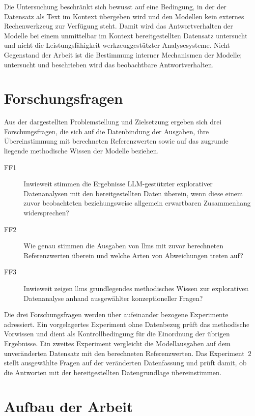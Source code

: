 Die Untersuchung beschränkt sich bewusst auf eine Bedingung, in der der Datensatz als Text im Kontext übergeben wird und den Modellen kein externes Rechenwerkzeug zur Verfügung steht. Damit wird das Antwortverhalten der Modelle bei einem unmittelbar im Kontext bereitgestellten Datensatz untersucht und nicht die Leistungsfähigkeit werkzeuggestützter Analysesysteme. Nicht Gegenstand der Arbeit ist die Bestimmung interner Mechanismen der Modelle; untersucht und beschrieben wird das beobachtbare Antwortverhalten.

\section{Forschungsfragen}

Aus der dargestellten Problemstellung und Zielsetzung ergeben sich drei Forschungsfragen, die sich auf die Datenbindung der Ausgaben, ihre Übereinstimmung mit berechneten Referenzwerten sowie auf das zugrunde liegende methodische Wissen der Modelle beziehen.

\begin{description}
    \item[FF1] Inwieweit stimmen die Ergebnisse LLM-gestützter explorativer Datenanalysen mit den bereitgestellten Daten überein, wenn diese einem zuvor beobachteten beziehungsweise allgemein erwartbaren Zusammenhang widersprechen?
    
    \item[FF2] Wie genau stimmen die Ausgaben von \glspl{llm} mit zuvor berechneten Referenzwerten überein und welche Arten von Abweichungen treten auf?
    
    \item[FF3] Inwieweit zeigen \glspl{llm}  grundlegendes methodisches Wissen zur explorativen Datenanalyse anhand ausgewählter konzeptioneller Fragen?
\end{description}

Die drei Forschungsfragen werden über aufeinander bezogene Experimente adressiert. Ein vorgelagertes Experiment ohne Datenbezug prüft das methodische Vorwissen und dient als Kontrollbedingung für die Einordnung der übrigen Ergebnisse. Ein zweites Experiment vergleicht die Modellausgaben auf dem unveränderten Datensatz mit den berechneten Referenzwerten. Das Experiment~2 stellt ausgewählte Fragen auf der veränderten Datenfassung und prüft damit, ob die Antworten mit der bereitgestellten Datengrundlage übereinstimmen.

\section{Aufbau der Arbeit}

